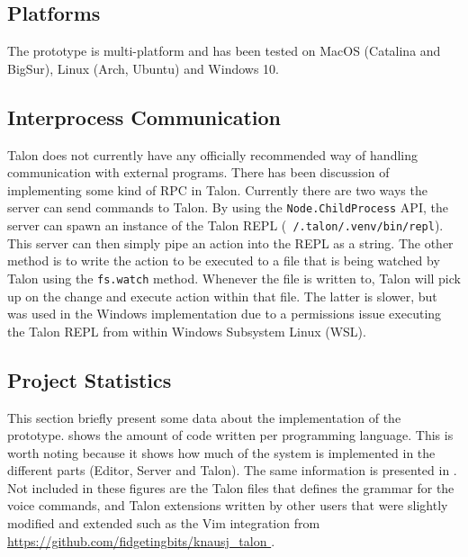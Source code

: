 \documentclass[../thesis.tex]{subfiles}
\begin{document}
\subsection{Platforms}
The prototype is multi-platform and has been tested on MacOS (Catalina and BigSur), Linux (Arch, Ubuntu) and Windows 10.

\subsection{Interprocess Communication}
Talon does not currently have any officially recommended way of handling communication with external programs.
There has been discussion of implementing some kind of RPC in Talon.
Currently there are two ways the server can send commands to Talon.
By using the \texttt{Node.ChildProcess} API, the server can spawn an instance of the Talon REPL (\texttt{~/.talon/.venv/bin/repl}).
This server can then simply pipe an action into the REPL as a string.
The other method is to write the action to be executed to a file that is being watched by Talon using the \texttt{fs.watch}
method. Whenever the file is written to, Talon will pick up on the change and execute action within that file.
The latter is slower, but was used in the Windows implementation due to a permissions issue executing the Talon REPL from within Windows Subsystem Linux (WSL).



\subsection{Project Statistics}%
\label{sub:project_statistics}
This section briefly present some data about the implementation of the prototype.
 shows the amount of code written per programming language.
This is worth noting because it shows how much of the system is implemented in the different parts
(Editor, Server and Talon).
The same information is presented in .
Not included in these figures are the Talon files that defines the grammar for the voice commands,
and Talon extensions written by other users that were slightly modified and extended such as the Vim integration from \url{https://github.com/fidgetingbits/knausj_talon
}.

%   
\end{document}
